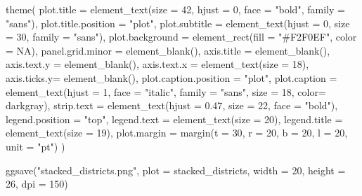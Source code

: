 \documentclass[
  letterpaper,
  DIV=11,
  numbers=noendperiod]{scrartcl}
\newenvironment{Shaded}{\begin{snugshade}}{\end{snugshade}}
\newcommand{\AttributeTok}[1]{\textcolor[rgb]{0.40,0.45,0.13}{#1}}
\newcommand{\ConstantTok}[1]{\textcolor[rgb]{0.56,0.35,0.01}{#1}}
\newcommand{\DecValTok}[1]{\textcolor[rgb]{0.68,0.00,0.00}{#1}}
\newcommand{\FloatTok}[1]{\textcolor[rgb]{0.68,0.00,0.00}{#1}}
\newcommand{\FunctionTok}[1]{\textcolor[rgb]{0.28,0.35,0.67}{#1}}
\newcommand{\NormalTok}[1]{\textcolor[rgb]{0.00,0.23,0.31}{#1}}
\newcommand{\StringTok}[1]{\textcolor[rgb]{0.13,0.47,0.30}{#1}}
\begin{document}
\begin{Shaded}
\begin{Highlighting}[]
  \FunctionTok{theme}\NormalTok{(}
    \AttributeTok{plot.title =} \FunctionTok{element\_text}\NormalTok{(}\AttributeTok{size =} \DecValTok{42}\NormalTok{, }\AttributeTok{hjust =} \DecValTok{0}\NormalTok{, }\AttributeTok{face =} \StringTok{"bold"}\NormalTok{, }\AttributeTok{family =} \StringTok{"sans"}\NormalTok{),}
    \AttributeTok{plot.title.position =} \StringTok{"plot"}\NormalTok{,}
    \AttributeTok{plot.subtitle  =} \FunctionTok{element\_text}\NormalTok{(}\AttributeTok{hjust =} \DecValTok{0}\NormalTok{, }\AttributeTok{size =} \DecValTok{30}\NormalTok{, }\AttributeTok{family =} \StringTok{"sans"}\NormalTok{),}
    \AttributeTok{plot.background =} \FunctionTok{element\_rect}\NormalTok{(}\AttributeTok{fill =} \StringTok{"\#F2F0EF"}\NormalTok{, }\AttributeTok{color =} \ConstantTok{NA}\NormalTok{),}
    \AttributeTok{panel.grid.minor =} \FunctionTok{element\_blank}\NormalTok{(),}
    \AttributeTok{axis.title  =} \FunctionTok{element\_blank}\NormalTok{(),}
    \AttributeTok{axis.text.y =} \FunctionTok{element\_blank}\NormalTok{(),}
    \AttributeTok{axis.text.x =} \FunctionTok{element\_text}\NormalTok{(}\AttributeTok{size =} \DecValTok{18}\NormalTok{),}
    \AttributeTok{axis.ticks.y=} \FunctionTok{element\_blank}\NormalTok{(),}
 \AttributeTok{plot.caption.position =} \StringTok{"plot"}\NormalTok{,}
    \AttributeTok{plot.caption  =} \FunctionTok{element\_text}\NormalTok{(}\AttributeTok{hjust =} \DecValTok{1}\NormalTok{, }\AttributeTok{face =} \StringTok{"italic"}\NormalTok{, }\AttributeTok{family =} \StringTok{"sans"}\NormalTok{, }\AttributeTok{size =} \DecValTok{18}\NormalTok{, }\AttributeTok{color=} \StringTok{\textquotesingle{}darkgray\textquotesingle{}}\NormalTok{),}
    \AttributeTok{strip.text =} \FunctionTok{element\_text}\NormalTok{(}\AttributeTok{hjust =} \FloatTok{0.47}\NormalTok{, }\AttributeTok{size =} \DecValTok{22}\NormalTok{, }\AttributeTok{face =} \StringTok{"bold"}\NormalTok{),}
\AttributeTok{legend.position =} \StringTok{"top"}\NormalTok{,}
     \AttributeTok{legend.text =} \FunctionTok{element\_text}\NormalTok{(}\AttributeTok{size =} \DecValTok{20}\NormalTok{),}
    \AttributeTok{legend.title =} \FunctionTok{element\_text}\NormalTok{(}\AttributeTok{size =} \DecValTok{19}\NormalTok{),}
 \AttributeTok{plot.margin =} \FunctionTok{margin}\NormalTok{(}\AttributeTok{t =} \DecValTok{30}\NormalTok{, }\AttributeTok{r =} \DecValTok{20}\NormalTok{, }\AttributeTok{b =} \DecValTok{20}\NormalTok{, }\AttributeTok{l =} \DecValTok{20}\NormalTok{, }\AttributeTok{unit =} \StringTok{"pt"}\NormalTok{)}
\NormalTok{  )}

\FunctionTok{ggsave}\NormalTok{(}\StringTok{"stacked\_districts.png"}\NormalTok{, }\AttributeTok{plot =}\NormalTok{ stacked\_districts, }\AttributeTok{width =} \DecValTok{20}\NormalTok{, }\AttributeTok{height =} \DecValTok{26}\NormalTok{, }\AttributeTok{dpi =} \DecValTok{150}\NormalTok{)}
\end{Highlighting}
\end{Shaded}
\end{document}
